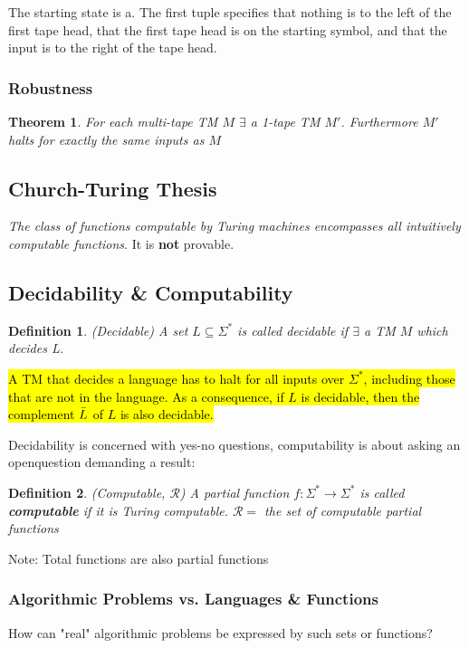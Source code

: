 \documentclass[a3paper, 8pt]{extarticle}
\newtheorem{theorem}{Theorem}[section]
\newtheorem*{definition}{Definition}
\begin{document}
\begin{multicols*}{6}
\begin{tabular}{c c}
\end{tabular}
The starting state is a. The first tuple specifies that nothing is to the left of the first tape head, that the first tape head is on the starting symbol, and that the input is to the right of the tape head.
\subsubsection{Robustness}

\begin{theorem}
For each multi-tape TM $M$ $\exists$ a 1-tape TM $M'$. Furthermore $M'$ halts for exactly the same inputs as $M$
\end{theorem}

\subsection{Church-Turing Thesis}
\textit{The class of functions computable by Turing machines encompasses all intuitively computable functions}. It is \textbf{not} provable.

\subsection{Decidability \& Computability}

\begin{definition}
     (Decidable)
     A set $L \subseteq \Sigma^*$ is called decidable if $\exists$ a TM $M$ which decides L.
\end{definition}

\hl{A TM that decides a language has to halt for all inputs over $\Sigma^*$, including those that are not in the language. As a consequence, if $L$ is decidable, then the complement $\Bar{L}$ of $L$ is also decidable.}

Decidability is concerned with yes-no questions, computability is about asking an openquestion demanding a result:
\begin{definition}
     (Computable, $\mathcal{R}$)
     A partial function $f: \Sigma^* \to \Sigma^*$ is called \textbf{computable} if it is Turing computable. $\mathcal{R}=$ the set of computable partial functions
\end{definition}

Note: Total functions are also partial functions

\subsubsection{Algorithmic Problems vs. Languages \& Functions}
How can "real" algorithmic problems be expressed by such sets or functions?


\end{multicols*}
\end{document}
